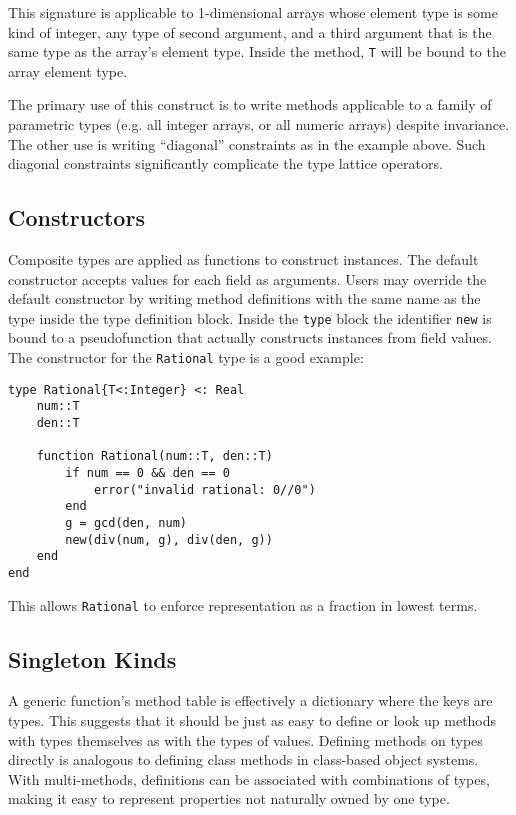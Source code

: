 \documentclass[9pt]{sigplanconf}
\begin{document}
This signature is applicable to 1-dimensional arrays whose element type is
some kind of integer, any type of second argument, and a third argument
that is the same type as the array's element type. Inside the method,
{\tt T} will be bound to the array element type.

The primary use of this construct is to write methods applicable to a
family of parametric types
(e.g. all integer arrays, or all numeric arrays)
despite invariance. The other use is
writing ``diagonal'' constraints as in the example above. Such diagonal
constraints significantly complicate the type lattice operators.


\subsection{Constructors}

Composite types are applied as functions to construct instances.
The default constructor accepts values for each field as arguments.
Users may override the default constructor by writing method definitions
with the same name as the type inside the type definition block. Inside the
{\tt type} block the identifier {\tt new} is bound to a pseudofunction
that actually constructs instances from field values. The constructor
for the {\tt Rational} type is a good example:

\begin{verbatim}
type Rational{T<:Integer} <: Real
    num::T
    den::T

    function Rational(num::T, den::T)
        if num == 0 && den == 0
            error("invalid rational: 0//0")
        end
        g = gcd(den, num)
        new(div(num, g), div(den, g))
    end
end
\end{verbatim}

This allows {\tt Rational} to enforce representation as a fraction in
lowest terms.

\subsection{Singleton Kinds}

A generic function's method table is effectively a dictionary where the keys
are types. This suggests that it should be just as easy to define or look up
methods with types themselves as with the types of values. Defining methods on
types directly is analogous to defining class methods in class-based object
systems. With multi-methods, definitions can be associated with combinations
of types, making it easy to represent properties not naturally owned by one
type.
\end{document}
